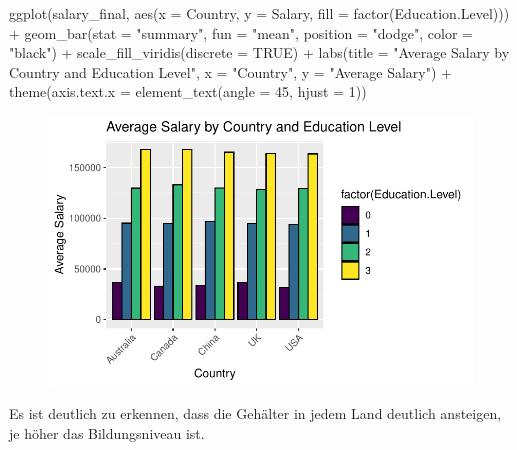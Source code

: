 \documentclass[
  letterpaper,
  DIV=11,
  numbers=noendperiod]{scrartcl}
\newenvironment{Shaded}{\begin{snugshade}}{\end{snugshade}}
\newcommand{\AttributeTok}[1]{\textcolor[rgb]{0.40,0.45,0.13}{#1}}
\newcommand{\ConstantTok}[1]{\textcolor[rgb]{0.56,0.35,0.01}{#1}}
\newcommand{\DecValTok}[1]{\textcolor[rgb]{0.68,0.00,0.00}{#1}}
\newcommand{\FunctionTok}[1]{\textcolor[rgb]{0.28,0.35,0.67}{#1}}
\newcommand{\NormalTok}[1]{\textcolor[rgb]{0.00,0.23,0.31}{#1}}
\newcommand{\SpecialCharTok}[1]{\textcolor[rgb]{0.37,0.37,0.37}{#1}}
\newcommand{\StringTok}[1]{\textcolor[rgb]{0.13,0.47,0.30}{#1}}
\begin{document}
\begin{Shaded}
\begin{Highlighting}[]
\FunctionTok{ggplot}\NormalTok{(salary\_final, }\FunctionTok{aes}\NormalTok{(}\AttributeTok{x =}\NormalTok{ Country, }\AttributeTok{y =}\NormalTok{ Salary, }\AttributeTok{fill =} \FunctionTok{factor}\NormalTok{(Education.Level))) }\SpecialCharTok{+}
  \FunctionTok{geom\_bar}\NormalTok{(}\AttributeTok{stat =} \StringTok{"summary"}\NormalTok{, }\AttributeTok{fun =} \StringTok{"mean"}\NormalTok{, }\AttributeTok{position =} \StringTok{"dodge"}\NormalTok{, }\AttributeTok{color =} \StringTok{"black"}\NormalTok{) }\SpecialCharTok{+}
  \FunctionTok{scale\_fill\_viridis}\NormalTok{(}\AttributeTok{discrete =} \ConstantTok{TRUE}\NormalTok{) }\SpecialCharTok{+}
  \FunctionTok{labs}\NormalTok{(}\AttributeTok{title =} \StringTok{"Average Salary by Country and Education Level"}\NormalTok{,}
       \AttributeTok{x =} \StringTok{"Country"}\NormalTok{,}
       \AttributeTok{y =} \StringTok{"Average Salary"}\NormalTok{) }\SpecialCharTok{+}
  \FunctionTok{theme}\NormalTok{(}\AttributeTok{axis.text.x =} \FunctionTok{element\_text}\NormalTok{(}\AttributeTok{angle =} \DecValTok{45}\NormalTok{, }\AttributeTok{hjust =} \DecValTok{1}\NormalTok{))  }
\end{Highlighting}
\end{Shaded}

\begin{figure}[H]

{\centering \includegraphics{main_doc_files/figure-pdf/unnamed-chunk-33-1.pdf}

}

\end{figure}

Es ist deutlich zu erkennen, dass die Gehälter in jedem Land deutlich
ansteigen, je höher das Bildungsniveau ist.
\end{document}
